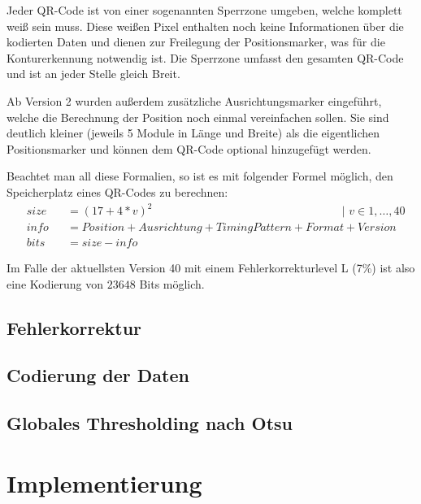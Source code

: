 \documentclass[a4paper, oneside, 12pt]{article}
\begin{document}
Jeder QR-Code ist von einer sogenannten Sperrzone umgeben, welche komplett weiß sein muss. Diese weißen Pixel enthalten noch keine Informationen über die kodierten Daten und dienen zur Freilegung der Positionsmarker, was für die Konturerkennung notwendig ist. Die Sperrzone umfasst den gesamten QR-Code und ist an jeder Stelle gleich Breit.

Ab Version 2 wurden außerdem zusätzliche Ausrichtungsmarker eingeführt, welche die Berechnung der Position noch einmal vereinfachen sollen. Sie sind deutlich kleiner (jeweils 5 Module in Länge und Breite) als die eigentlichen Positionsmarker und können dem QR-Code optional hinzugefügt werden.

Beachtet man all diese Formalien, so ist es mit folgender Formel möglich, den Speicherplatz eines QR-Codes zu berechnen:
\begin{align*}
&size &&= (17 + 4 * v)^2 \hspace{200pt} | \,\, v \in 1,\dots,40\\
&info &&= Position + Ausrichtung + TimingPattern + Format + Version\\
&bits &&= size - info
\end{align*}

Im Falle der aktuellsten Version 40 mit einem Fehlerkorrekturlevel L (7\%) ist also eine Kodierung von $23648$ Bits möglich.

\subsection{Fehlerkorrektur}
\label{ss:fehlerkorrektur}

\subsection{Codierung der Daten}
\label{ss:codierung}

\subsection{Globales Thresholding nach Otsu}
\label{ss:otsu}


\newpage

\section{Implementierung}
\label{s:implementierung}
\end{document}
